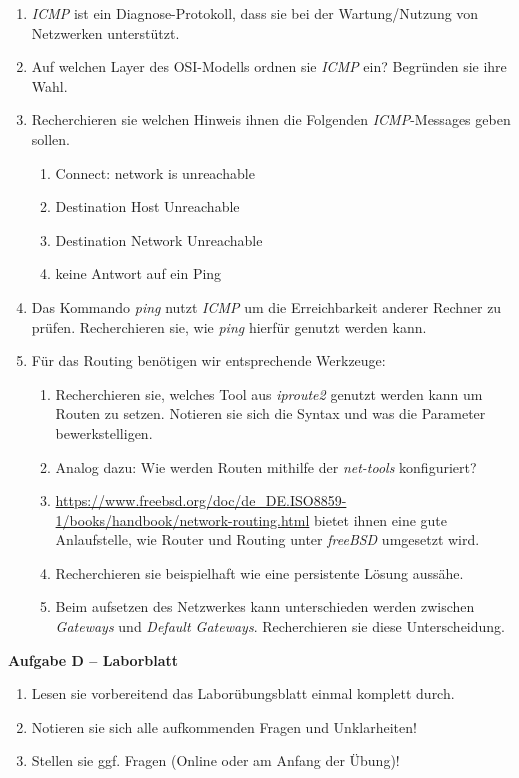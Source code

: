 \documentclass[paper=a4,fontsize=11pt]{scrartcl}%
\numberwithin{equation}{section}
\begin{document}
\begin{enumerate}
	\item \emph{ICMP} ist ein Diagnose-Protokoll, dass sie bei der Wartung/Nutzung von Netzwerken unterstützt.
	\item Auf welchen Layer des OSI-Modells ordnen sie \emph{ICMP} ein? Begründen sie ihre Wahl.
	\item Recherchieren sie welchen Hinweis ihnen die Folgenden \emph{ICMP}-Messages geben sollen.
	\begin{enumerate}
		\item Connect: network is unreachable
		\item Destination Host Unreachable
		\item Destination Network Unreachable
		\item keine Antwort auf ein Ping
	\end{enumerate}
	\item Das Kommando \emph{ping} nutzt \emph{ICMP} um die Erreichbarkeit anderer Rechner zu prüfen. Recherchieren sie, wie \emph{ping} hierfür genutzt werden kann.
	\item Für das Routing benötigen wir entsprechende Werkzeuge:
	\begin{enumerate}
		\item Recherchieren sie, welches Tool aus \emph{iproute2} genutzt werden kann um Routen zu setzen. Notieren sie sich die Syntax und was die Parameter bewerkstelligen.
	\item Analog dazu: Wie werden Routen mithilfe der \emph{net-tools} konfiguriert?
	\item \url{https://www.freebsd.org/doc/de_DE.ISO8859-1/books/handbook/network-routing.html} bietet ihnen eine gute Anlaufstelle, wie Router und Routing unter \emph{freeBSD} umgesetzt wird.
	\item Recherchieren sie beispielhaft wie eine persistente Lösung aussähe.
	\item Beim aufsetzen des Netzwerkes kann unterschieden werden zwischen \emph{Gateways} und \emph{Default Gateways}. Recherchieren sie diese Unterscheidung.
\end{enumerate}	 
\end{enumerate}

\begin{center}\Large{\textbf{Aufgabe D -- Laborblatt}}\end{center}
\begin{enumerate}
	\item Lesen sie vorbereitend das Laborübungsblatt einmal komplett durch.
	\item Notieren sie sich alle aufkommenden Fragen und Unklarheiten!
	\item Stellen sie ggf. Fragen (Online oder am Anfang der Übung)! 
\end{enumerate}
\end{document}
